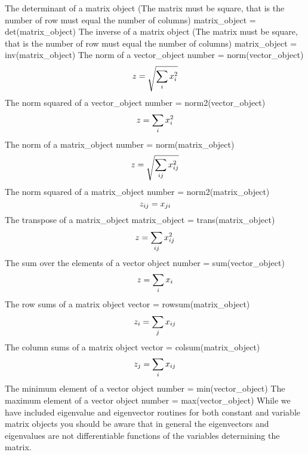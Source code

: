 \noindent The determinant of a matrix object (The matrix must be square, that 
is the number of row must equal the number of columns)
\beginexample
matrix_object = det(matrix_object)
\endexample
\noindent The inverse of a matrix object (The matrix must be square, that 
is the number of row must equal the number of columns)
 
\beginexample
matrix_object = inv(matrix_object)
\endexample
\noindent The norm of a vector\_object
\beginexample
number = norm(vector_object)
\endexampledf
$$\leftset{z=\sqrt{\sum_{i} x_{i}^2} }$$
\noindent The norm squared of a vector\_object
\beginexample
number = norm2(vector_object)
\endexampledf
$$\leftset{z=\sum_{i} x_{i}^2 }$$
The norm of a matrix\_object
\beginexample
number = norm(matrix_object)
\endexampledf
{}
$$\leftset{z=\sqrt{\sum_{ij} x_{ij}^2} }$$
The norm squared of a matrix\_object
\beginexample
number = norm2(matrix_object)
\endexampledf
$$\leftset{z_{ij}=x_{ji} }$$
The transpose of a matrix\_object
\beginexample
matrix_object = trans(matrix_object)
\endexampledf
$$\leftset{z=\sum_{ij} x_{ij}^2 }$$
\goodbreak
\noindent The sum over the elements of a vector object
\beginexample
number = sum(vector_object)
\endexample
$$\leftset{z=\sum_i x_i }$$
\noindent The row sums of a matrix object
\beginexample
vector = rowsum(matrix_object)
\endexampledf
$$\leftset{z_i=\sum_j x_{ij} }$$
\noindent The column sums of a matrix object
\beginexample
vector = colsum(matrix_object)
\endexampledf
$$\leftset{z_j=\sum_i x_{ij} }$$
\noindent The minimum element of a vector object
\beginexample
number = min(vector_object)
\endexample
{}
\noindent The maximum element of a vector object
\beginexample
number = max(vector_object)
\endexample
{}
While we have included eigenvalue and eigenvector routines for
both constant and variable matrix objects you should be aware
that in general the eigenvectors and eigenvalues are not differentiable
functions of the variables determining the matrix.  

